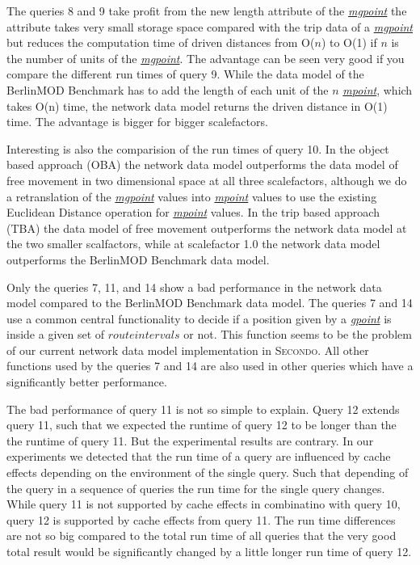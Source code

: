 \documentclass[a4paper]{article}
\newcommand{\secondo}{\textsc{Secondo}}
\newcommand{\bmodb} {BerlinMOD Benchmark}
\newcommand{\dt}[1]{\textsl{\underline{#1}}}
\begin{document}
The queries 8 and 9 take profit from the new length attribute of the \dt{mgpoint}
the attribute takes very small storage space compared with the trip data of a
\dt{mgpoint} but reduces the computation time of driven distances from O($n$) to
O(1) if $n$ is the number of units of the \dt{mgpoint}. The advantage can be seen
very good if you compare the different run times of query 9. While the data model
of the \bmodb{} has to add the length of each unit of the $n$ \dt{mpoint}, which
takes O(n) time, the network data model returns the driven distance in O(1) time.
The advantage is bigger for bigger scalefactors.

Interesting is also the comparision of the run times of query 10. In the object
based approach (OBA) the network data model outperforms the data model of free
movement in two dimensional space at all three scalefactors, although we do a
retranslation of the \dt{mgpoint} values into \dt{mpoint} values to use the
existing Euclidean Distance operation for \dt{mpoint} values. In
the trip based approach (TBA) the data model of free movement outperforms the network
data model at the two smaller scalfactors, while at scalefactor 1.0 the network
data model outperforms the \bmodb{} data model.

Only the queries 7, 11, and 14 show a bad performance in the network data model
compared to the \bmodb{} data model. The queries 7 and 14 use a common central
functionality to decide if a position given by a \dt{gpoint} is inside a given set of
$route intervals$ or not. This function seems to be the problem of our current
network data model implementation in \secondo{}. All other functions used by the queries
7 and 14 are also used in other queries which have a significantly better
performance.

The bad performance of query 11 is not so simple to explain. Query 12 extends query 11,
such that we expected the runtime of query 12 to be longer than the the runtime
of query 11. But the experimental results are contrary. In our experiments we
detected that the run time of a query are influenced by cache effects depending
on the environment of the single query. Such that depending of the query in a
sequence of queries the run time for the single query changes. While query 11 is not
supported by cache effects in combinatino with query 10, query 12 is supported by
cache effects from query 11. The run time differences are not so big compared to
the total run time of all queries that the very good total result would be
significantly changed by a little longer run time of query 12.
\end{document}
